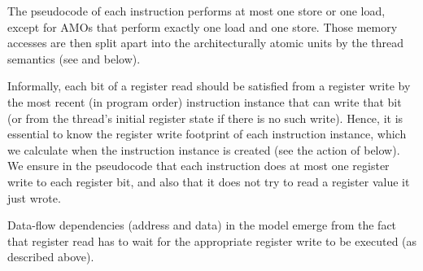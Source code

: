 The pseudocode of each instruction performs at most one store or one load, except for AMOs that perform exactly one load and one store.
Those memory accesses are then split apart into the architecturally atomic units by the thread semantics (see  and  below).

Informally, each bit of a register read should be satisfied from a register write by the most recent (in program order) instruction instance that can write that bit (or from the thread's initial register state if there is no such write).
Hence, it is essential to know the register write footprint of each instruction instance, which we calculate when the instruction instance is created (see the action of  below).
We ensure in the pseudocode that each instruction does at most one register write to each register bit, and also that it does not try to read a register value it just wrote.

Data-flow dependencies (address and data) in the model emerge from the fact that register read has to wait for the appropriate register write to be executed (as described above).

